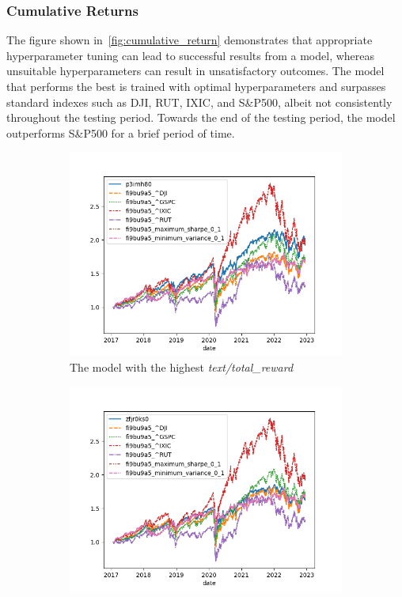\documentclass[../xlapes02]{subfiles}
\begin{document}
    \subsubsection{Cumulative Returns}
    The figure shown in~\cref{fig:cumulative_return} demonstrates that appropriate hyperparameter tuning can lead to successful results from a model, whereas unsuitable hyperparameters can result in unsatisfactory outcomes. The model that performs the best is trained with optimal hyperparameters and surpasses standard indexes such as DJI, RUT, IXIC, and S\&P500, albeit not consistently throughout the testing period. Towards the end of the testing period, the model outperforms S\&P500 for a brief period of time.
    \begin{figure}[h!]
        \centering
        \begin{subfigure}[t]{\experimentimgwidth\textwidth}
            \centering
            \includegraphics[width=\linewidth]{image/figure/returns_max}
            \caption{The model with the highest \emph{text/total\_reward}}
            \label{fig:returns_max}
        \end{subfigure}
        \hfill
        \begin{subfigure}[t]{\experimentimgwidth\textwidth}
            \centering
            \includegraphics[width=\linewidth]{image/figure/returns_min}

\end{subfigure}
\end{figure}
\end{document}
